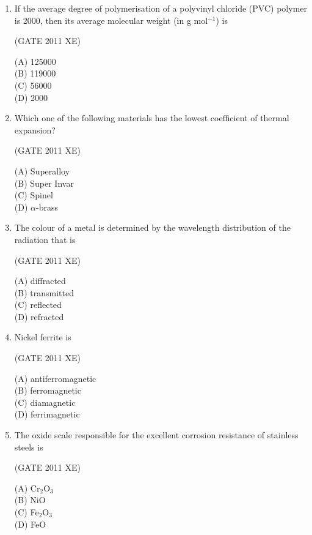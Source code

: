 \documentclass[journal,12pt,onecolumn]{IEEEtran}
\begin{document}
\begin{enumerate}
\item If the average degree of polymerisation of a polyvinyl chloride (PVC) polymer is 2000, then its average molecular weight (in g mol$^{-1}$) is

\hfill{(GATE 2011 XE)}\\
\begin{multicols}{4}
(A) 125000 \\
(B) 119000 \\
(C) 56000 \\
(D) 2000
\end{multicols}

\item Which one of the following materials has the lowest coefficient of thermal expansion?

\hfill{(GATE 2011 XE)}\\
\begin{multicols}{4}
(A) Superalloy \\
(B) Super Invar \\
(C) Spinel \\
(D) $\alpha$-brass
\end{multicols}


\item The colour of a metal is determined by the wavelength distribution of the radiation that is

\hfill{(GATE 2011 XE)}\\
\begin{multicols}{4}
(A) diffracted \\
(B) transmitted \\
(C) reflected \\
(D) refracted
\end{multicols}

\newpage

\item Nickel ferrite is

\hfill{(GATE 2011 XE)}\\
\begin{multicols}{4}
(A) antiferromagnetic \\
(B) ferromagnetic \\
(C) diamagnetic \\
(D) ferrimagnetic
\end{multicols}

\item The oxide scale responsible for the excellent corrosion resistance of stainless steels is

\hfill{(GATE 2011 XE)}\\
\begin{multicols}{4}
(A) Cr$_2$O$_3$ \\
(B) NiO \\
(C) Fe$_2$O$_3$ \\
(D) FeO
\end{multicols}


\end{enumerate}
\end{document}
